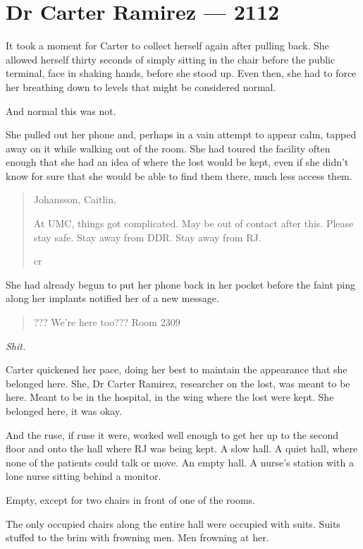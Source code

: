 \hypertarget{dr-carter-ramirez-2112}{%
\chapter*{Dr Carter Ramirez — 2112}\label{dr-carter-ramirez-2112}}

It took a moment for Carter to collect herself again after pulling back. She allowed herself thirty seconds of simply sitting in the chair before the public terminal, face in shaking hands, before she stood up. Even then, she had to force her breathing down to levels that might be considered normal.

And normal this was not.

She pulled out her phone and, perhaps in a vain attempt to appear calm, tapped away on it while walking out of the room. She had toured the facility often enough that she had an idea of where the lost would be kept, even if she didn't know for sure that she would be able to find them there, much less access them.

\begin{quote}
Johansson, Caitlin,

At UMC, things got complicated. May be out of contact after this. Please stay safe. Stay away from DDR. Stay away from RJ.

cr
\end{quote}

She had already begun to put her phone back in her pocket before the faint ping along her implants notified her of a new message.

\begin{quote}
??? We're here too??? Room 2309
\end{quote}

\emph{Shit.}

Carter quickened her pace, doing her best to maintain the appearance that she belonged here. She, Dr Carter Ramirez, researcher on the lost, was meant to be here. Meant to be in the hospital, in the wing where the lost were kept. She belonged here, it was okay.

And the ruse, if ruse it were, worked well enough to get her up to the second floor and onto the hall where RJ was being kept. A slow hall. A quiet hall, where none of the patients could talk or move. An empty hall. A nurse's station with a lone nurse sitting behind a monitor.

Empty, except for two chairs in front of one of the rooms.

The only occupied chairs along the entire hall were occupied with suits. Suits stuffed to the brim with frowning men. Men frowning at her.

